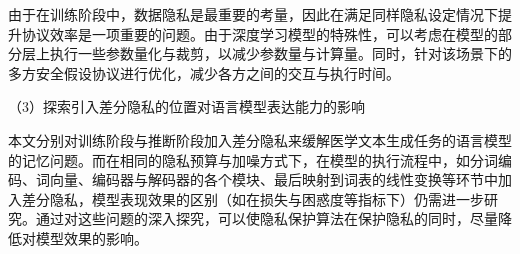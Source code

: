 由于在训练阶段中，数据隐私是最重要的考量，因此在满足同样隐私设定情况下提升协议效率是一项重要的问题。由于深度学习模型的特殊性，可以考虑在模型的部分层上执行一些参数量化与裁剪，以减少参数量与计算量。同时，针对该场景下的多方安全假设协议进行优化，减少各方之间的交互与执行时间。

（3）探索引入差分隐私的位置对语言模型表达能力的影响

本文分别对训练阶段与推断阶段加入差分隐私来缓解医学文本生成任务的语言模型的记忆问题。而在相同的隐私预算与加噪方式下，在模型的执行流程中，如分词编码、词向量、编码器与解码器的各个模块、最后映射到词表的线性变换等环节中加入差分隐私，模型表现效果的区别（如在损失与困惑度等指标下）仍需进一步研究。通过对这些问题的深入探究，可以使隐私保护算法在保护隐私的同时，尽量降低对模型效果的影响。

%
